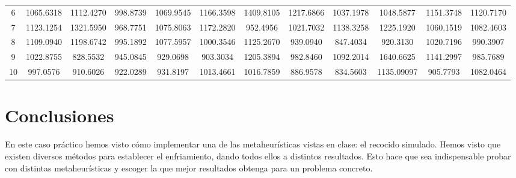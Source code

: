 \documentclass[12pt,a4paper,twoside,openright,titlepage,final]{article}
\begin{document}
\begin{landscape}
\begin{table}[htbp!]
{\begin{tabular}{@{}cccccccccccc@{}}
				6         & 1065.6318                        & 1112.4270                        & \cellcolor[HTML]{FFFE65}998.8739 & 1069.9545                         & 1166.3598         & 1409.8105         & 1217.6866         & 1037.1978                        & 1048.5877                        & 1151.3748                        & 1120.7170          \\
				7         & 1123.1254                        & 1321.5950                        & \cellcolor[HTML]{FFFE65}968.7751 & 1075.8063                         & 1172.2820         & 952.4956          & 1021.7032         & 1138.3258                        & 1225.1920                        & 1060.1519                        & 1082.4603          \\
				8         & 1109.0940                        & 1198.6742                        & 995.1892                         & 1077.5957                         & 1000.3546         & 1125.2670         & 939.0940          & \cellcolor[HTML]{FFFE65}847.4034 & 920.3130                         & 1020.7196                        & 990.3907           \\
				9         & 1022.8755                        & \cellcolor[HTML]{FFFE65}828.5532 & 945.0845                         & 929.0698                          & 903.3034          & 1205.3894         & 982.8460          & 1092.2014                        & 1640.6625                        & 1141.2997                        & 985.7689           \\
				10        & 997.0576                         & 910.6026                         & 922.0289                         & 931.8197                          & 1013.4661         & 1016.7859         & 886.9578          & \cellcolor[HTML]{FFFE65}834.5603 & 1135.09097                       & 905.7793                         & 1082.0464          \\ \bottomrule
			\end{tabular}%
		}
	\end{table}
	\vspace*{\fill}
\end{landscape}

\section{Conclusiones}

En este caso práctico hemos visto cómo implementar una de las metaheurísticas vistas en clase: el recocido simulado. Hemos visto que existen diversos métodos para establecer el enfriamiento, dando todos ellos a distintos resultados. Esto hace que sea indispensable probar con distintas metaheurísticas y escoger la que mejor resultados obtenga para un problema concreto.
\end{document}
